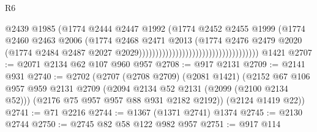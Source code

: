 \begin{lexlean}{R6}
\begin{coremodule}
                                                                @2439
                                                                @1985
                                                                (@1774
                                                                  @2444
                                                                  @2447
                                                                  @1992
                                                                  (@1774
                                                                    @2452
                                                                    @2455
                                                                    @1999
                                                                    (@1774
                                                                      @2460
                                                                      @2463
                                                                      @2006
                                                                      (@1774
                                                                        @2468
                                                                        @2471
                                                                        @2013
                                                                        (@1774
                                                                          @2476
                                                                          @2479
                                                                          @2020
                                                                          (@1774
                                                                            @2484
                                                                            @2487
                                                                            @2027
                                                                            @2029))))))))))))))))))))))))))))))))))))
    @1421
@2707 := @2071 @2134 @62 @107 @960 @957
@2708 := @917 @2131
@2709 := @2141 @931
@2740 := @2702
    (@2707
      (@2708 @2709)
      (@2081 @1421)
      (@2152
        @67
        @106
        @957
        @959
        @2131
        @2709
        (@2094 @2134 @52 @2131 (@2099 (@2100 @2134 @52)))
        (@2176 @75 @957 @957 @88 @931 @2182 @2192))
      (@2124 @1419 @22))
@2741 := @71 @2216
@2744 := @1367 (@1371 @2741) @1374
@2745 := @2130 @2744
@2750 := @2745 @82 @58 @122 @982 @957
@2751 := @917 @114

\end{coremodule}
\end{lexlean}
